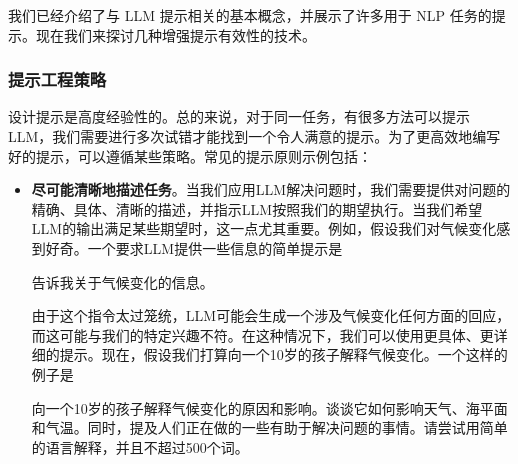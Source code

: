 \noindent 我们已经介绍了与 LLM 提示相关的基本概念，并展示了许多用于 NLP 任务的提示。现在我们来探讨几种增强提示有效性的技术。

\subsubsection{提示工程策略}

\noindent 设计提示是高度经验性的。总的来说，对于同一任务，有很多方法可以提示LLM，我们需要进行多次试错才能找到一个令人满意的提示。为了更高效地编写好的提示，可以遵循某些策略。常见的提示原则示例包括：

\begin{itemize}
\item \vspace{0.5em} \textbf{尽可能清晰地描述任务}。当我们应用LLM解决问题时，我们需要提供对问题的精确、具体、清晰的描述，并指示LLM按照我们的期望执行。当我们希望LLM的输出满足某些期望时，这一点尤其重要。例如，假设我们对气候变化感到好奇。一个要求LLM提供一些信息的简单提示是

    \vspace{0.5em}
    \begin{tcolorbox}

    \hspace{2em} 告诉我关于气候变化的信息。

    \hspace{2em} \underline{\hspace{2em}}

    \end{tcolorbox}
    \vspace{0.5em}

    由于这个指令太过笼统，LLM可能会生成一个涉及气候变化任何方面的回应，而这可能与我们的特定兴趣不符。在这种情况下，我们可以使用更具体、更详细的提示。现在，假设我们打算向一个10岁的孩子解释气候变化。一个这样的例子是

    \vspace{0.5em}
    \begin{tcolorbox}

    \begingroup
    \setlength{\leftskip}{2em}
    \setlength{\rightskip}{2em}

    向一个10岁的孩子解释气候变化的原因和影响。谈谈它如何影响天气、海平面和气温。同时，提及人们正在做的一些有助于解决问题的事情。请尝试用简单的语言解释，并且不超过500个词。

    \underline{\hspace{2em}}

    \endgroup


\end{tcolorbox}
\end{itemize}
